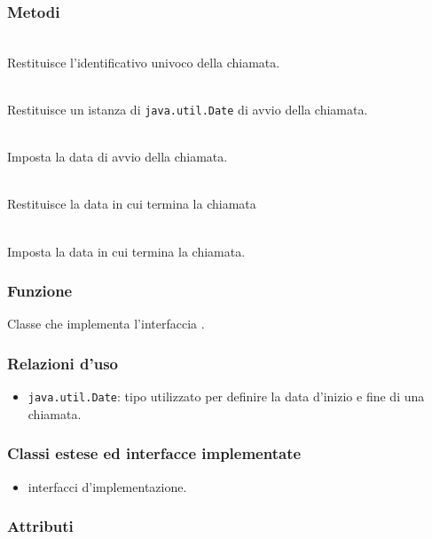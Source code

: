 \subsubsection*{Metodi}
\begin{description}
	\item{}\\
	Restituisce l'identificativo univoco della chiamata.
	\item{}\\
	Restituisce un istanza di \texttt{java.util.Date} di avvio della chiamata.
	\item{}\\
	Imposta la data di avvio della chiamata.
	\item{}\\
	Restituisce la data in cui termina la chiamata
	\item{}\\
	Imposta la data in cui termina la chiamata.
\end{description}


\subsubsection*{Funzione}
Classe che implementa l'interfaccia .

\subsubsection*{Relazioni d'uso}
\begin{itemize}
	\item \texttt{java.util.Date}: tipo utilizzato per definire la data d'inizio e fine di una chiamata.
\end{itemize}

\subsubsection*{Classi estese ed interfacce implementate}
\begin{itemize}
	\item {} interfacci d'implementazione.
\end{itemize}

\subsubsection*{Attributi}

